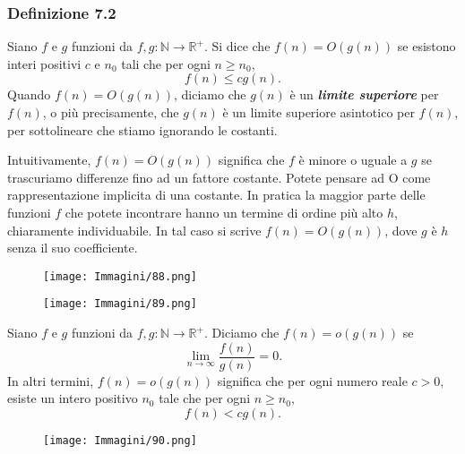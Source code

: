 \documentclass{article}
\begin{document}
\subsubsection*{Definizione 7.2}
\label{definizione-7.2}
\begin{tcolorbox}[colback=yellow!10!white, colframe=yellow!50!black, title=Definizione 7.2]
    Siano $f$ e $g$ funzioni da $f,g : \mathbb{N} \rightarrow \mathbb{R}^+$.
    Si dice che $f(n) = O(g(n))$ se esistono interi positivi $c$ e $n_0$ tali che per ogni $n \geq n_0$,
    $$
    f(n) \leq cg(n).
    $$
    Quando $f(n) = O(g(n))$, diciamo che $g(n)$ è un \textbf{\textit{limite superiore}} per $f(n)$, o più precisamente, che $g(n)$ è un limite superiore asintotico per $f(n)$, per sottolineare che stiamo ignorando le costanti.
\end{tcolorbox}
Intuitivamente, $f(n) = O(g(n))$ significa che $f$ è minore o uguale a $g$ se trascuriamo differenze fino ad un fattore costante.
Potete pensare ad O come rappresentazione implicita di una costante.
In pratica la maggior parte delle funzioni $f$ che potete incontrare hanno un termine di ordine più alto $h$, chiaramente individuabile.
In tal caso si scrive $f(n) = O(g(n))$, dove $g$ è $h$ senza il suo coefficiente.
\newline
\begin{figure}[H]
    \centering
    \texttt{[image: Immagini/88.png]}
    \label{fig:example_O_grande}
\end{figure}
\begin{figure}[H]
    \centering
    \texttt{[image: Immagini/89.png]}
    \label{fig:example_O_grande}
\end{figure}
\begin{tcolorbox}[colback=yellow!10!white, colframe=yellow!50!black, title=Definizione 7.5]
    Siano $f$ e $g$ funzioni da $f,g : \mathbb{N} \rightarrow \mathbb{R}^+$.
    Diciamo che $f(n) = o(g(n))$ se
    $$
    \lim_{n \to \infty} \frac{f(n)}{g(n)} = 0.
    $$
    In altri termini, $f(n) = o(g(n))$ significa che per ogni numero reale $c > 0$, esiste un intero positivo $n_0$ tale che per ogni $n \geq n_0$, 
    $$
    f(n) < cg(n).
    $$
\end{tcolorbox}

\begin{figure}[H]
    \centering
    \texttt{[image: Immagini/90.png]}
    \label{fig:example_O_grande}
\end{figure}
\end{document}
